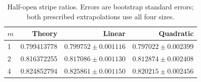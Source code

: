 \begin{table}[htbp]\centering\small\caption{Half-open stripe ratios. Errors are bootstrap standard errors; both prescribed extrapolations use all four sizes.}
\begin{tabular}{lrrr}\toprule
$m$ & Theory & Linear & Quadratic\\\midrule
1 & 0.799413778 & $0.799752\pm0.001116$ & $0.797022\pm0.002399$\\
2 & 0.816372255 & $0.817086\pm0.001130$ & $0.812874\pm0.002408$\\
4 & 0.824852794 & $0.825861\pm0.001150$ & $0.820215\pm0.002456$\\
\bottomrule\end{tabular}\end{table}
